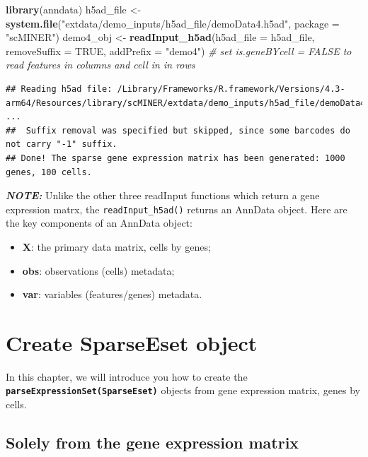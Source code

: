 \documentclass[
  12pt,
]{book}
\newenvironment{Shaded}{\begin{snugshade}}{\end{snugshade}}
\newcommand{\AttributeTok}[1]{\textcolor[rgb]{0.13,0.29,0.53}{#1}}
\newcommand{\CommentTok}[1]{\textcolor[rgb]{0.56,0.35,0.01}{\textit{#1}}}
\newcommand{\ConstantTok}[1]{\textcolor[rgb]{0.56,0.35,0.01}{#1}}
\newcommand{\FunctionTok}[1]{\textcolor[rgb]{0.13,0.29,0.53}{\textbf{#1}}}
\newcommand{\NormalTok}[1]{#1}
\newcommand{\OtherTok}[1]{\textcolor[rgb]{0.56,0.35,0.01}{#1}}
\newcommand{\StringTok}[1]{\textcolor[rgb]{0.31,0.60,0.02}{#1}}
\providecommand{\tightlist}{%
  \setlength{\itemsep}{0pt}\setlength{\parskip}{0pt}}
\begin{document}
\begin{Shaded}
\begin{Highlighting}[]
\FunctionTok{library}\NormalTok{(anndata)}
\NormalTok{h5ad\_file }\OtherTok{\textless{}{-}} \FunctionTok{system.file}\NormalTok{(}\StringTok{"extdata/demo\_inputs/h5ad\_file/demoData4.h5ad"}\NormalTok{, }\AttributeTok{package =} \StringTok{"scMINER"}\NormalTok{)}
\NormalTok{demo4\_obj }\OtherTok{\textless{}{-}} \FunctionTok{readInput\_h5ad}\NormalTok{(}\AttributeTok{h5ad\_file =}\NormalTok{ h5ad\_file, }\AttributeTok{removeSuffix =} \ConstantTok{TRUE}\NormalTok{, }\AttributeTok{addPrefix =} \StringTok{"demo4"}\NormalTok{) }\CommentTok{\# set is.geneBYcell = FALSE to read features in columns and cell in in rows}
\end{Highlighting}
\end{Shaded}

\begin{verbatim}
## Reading h5ad file: /Library/Frameworks/R.framework/Versions/4.3-arm64/Resources/library/scMINER/extdata/demo_inputs/h5ad_file/demoData4.h5ad ...
##  Suffix removal was specified but skipped, since some barcodes do not carry "-1" suffix.
## Done! The sparse gene expression matrix has been generated: 1000 genes, 100 cells.
\end{verbatim}

\textbf{\emph{NOTE:}} Unlike the other three readInput functions which return a gene expression matrx, the \texttt{readInput\_h5ad()} returns an AnnData object. Here are the key components of an AnnData object:

\begin{itemize}
\tightlist
\item
  \textbf{X}: the primary data matrix, cells by genes;
\item
  \textbf{obs}: observations (cells) metadata;
\item
  \textbf{var}: variables (features/genes) metadata.
\end{itemize}

\chapter{Create SparseEset object}\label{create-sparseeset-object}

In this chapter, we will introduce you how to create the \textbf{\texttt{parseExpressionSet(SparseEset)}} objects from gene expression matrix, genes by cells.

\section{Solely from the gene expression matrix}\label{solely-from-the-gene-expression-matrix}
\end{document}
